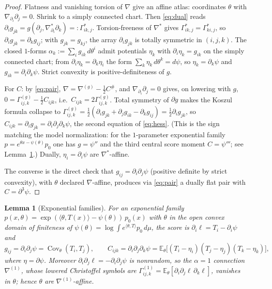\documentclass{amsart}
\newtheorem{lemma}{Lemma}
\theoremstyle{definition}
\theoremstyle{remark}
\begin{document}
\begin{proof}
Flatness and vanishing torsion of $\nabla$ give an affine atlas: coordinates
$\theta$ with $\nabla_{\partial_{i}}\partial_{j}=0$. Shrink to a simply connected
chart. Then \eqref{eq:dual} reads
$\partial_{i}g_{jk}=g(\partial_{j},\nabla^{*}_{\partial_{i}}\partial_{k})
=:\Gamma^{*}_{ik,j}$. Torsion-freeness of $\nabla^{*}$ gives
$\Gamma^{*}_{ik,j}=\Gamma^{*}_{ki,j}$, so $\partial_{i}g_{jk}=\partial_{k}g_{ij}$;
with $g_{jk}=g_{kj}$, the array $\partial_{i}g_{jk}$ is totally symmetric in
$(i,j,k)$. The closed $1$-forms $\alpha_{k}:=\sum_{i}g_{ik}\,d\theta^{i}$ admit
potentials $\eta_{k}$ with $\partial_{i}\eta_{k}=g_{ik}$ on the simply connected
chart; from $\partial_{i}\eta_{k}=\partial_{k}\eta_{i}$ the form
$\sum_{k}\eta_{k}\,d\theta^{k}=d\psi$, so $\eta_{k}=\partial_{k}\psi$ and
$g_{ik}=\partial_{i}\partial_{k}\psi$. Strict convexity is positive-definiteness
of $g$.

For $C$: by \eqref{eq:pair}, $\nabla=\nabla^{(g)}-\tfrac12 C^{\#}$, and
$\nabla_{\partial_{i}}\partial_{j}=0$ gives, on lowering with $g$,
$0=\Gamma^{(g)}_{ij,k}-\tfrac12 C_{ijk}$, i.e.\ $C_{ijk}=2\Gamma^{(g)}_{ij,k}$.
Total symmetry of $\partial g$ makes the Koszul formula collapse to
$\Gamma^{(g)}_{ij,k}=\tfrac12(\partial_{i}g_{jk}+\partial_{j}g_{ik}
-\partial_{k}g_{ij})=\tfrac12\partial_{i}g_{jk}$, so
$C_{ijk}=\partial_{i}g_{jk}=\partial_{i}\partial_{j}\partial_{k}\psi$, the second
equation of \eqref{eq:hess}. (This is the sign matching the model normalization:
for the $1$-parameter exponential family $p=e^{\theta x-\psi(\theta)}p_{0}$ one
has $g=\psi''$ and the third central score moment $C=\psi'''$; see
Lemma~\ref{lem:exp}.) Dually, $\eta_{i}=\partial_{i}\psi$ are $\nabla^{*}$-affine.

The converse is the direct check that $g_{ij}=\partial_{i}\partial_{j}\psi$
(positive definite by strict convexity), with $\theta$ declared $\nabla$-affine,
produces via \eqref{eq:pair} a dually flat pair with $C=\partial^{3}\psi$.
\end{proof}

\begin{lemma}[Exponential families]\label{lem:exp}
For an exponential family $p(x,\theta)=\exp(\langle\theta,T(x)\rangle
-\psi(\theta))\,p_{0}(x)$ with $\theta$ in the open convex domain of finiteness
of $\psi(\theta)=\log\int e^{\langle\theta,T\rangle}p_{0}\,d\mu$, the score is
$\partial_{i}\ell=T_{i}-\partial_{i}\psi$ and
\begin{equation}\label{eq:expgc}
  g_{ij}=\partial_{i}\partial_{j}\psi=\operatorname{Cov}_{\theta}(T_{i},T_{j}),
  \qquad
  C_{ijk}=\partial_{i}\partial_{j}\partial_{k}\psi
   =\mathbb E_{\theta}\!\bigl[(T_{i}-\eta_{i})(T_{j}-\eta_{j})(T_{k}-\eta_{k})\bigr],
\end{equation}
where $\eta=\partial\psi$. Moreover $\partial_{i}\partial_{j}\ell
=-\partial_{i}\partial_{j}\psi$ is nonrandom, so the $\alpha=1$ connection
$\nabla^{(1)}$, whose lowered Christoffel symbols are
$\Gamma^{(1)}_{ij,k}=\mathbb E_{\theta}[\partial_{i}\partial_{j}\ell\,
\partial_{k}\ell]$, vanishes in $\theta$; hence $\theta$ are
$\nabla^{(1)}$-affine.
\end{lemma}
\end{document}
